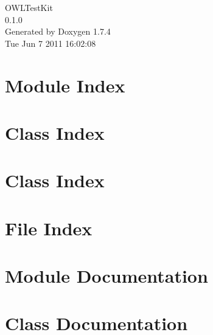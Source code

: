 \documentclass[a4paper]{book}
\begin{document}
\begin{titlepage}
\vspace*{7cm}
\begin{center}
{\Large OWLTestKit \\[1ex]\large 0.1.0 }\\
\vspace*{1cm}
{\large Generated by Doxygen 1.7.4}\\
\vspace*{0.5cm}
{\small Tue Jun 7 2011 16:02:08}\\
\end{center}
\end{titlepage}
\clearemptydoublepage
{}
\tableofcontents
\clearemptydoublepage
{}
\chapter{Module Index}

\chapter{Class Index}

\chapter{Class Index}

\chapter{File Index}

\chapter{Module Documentation}








\chapter{Class Documentation}
















\end{document}
